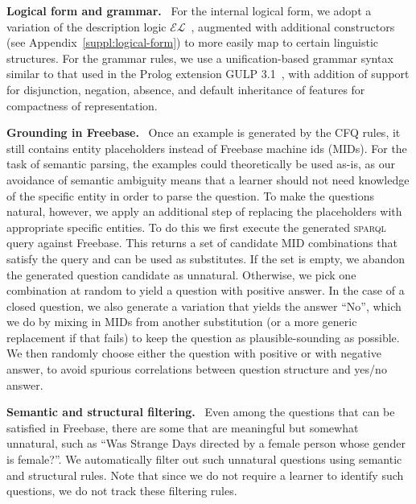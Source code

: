 \documentclass[letterpaper]{article}
\newcommand{\myparagraph}[1]{\textbf{#1}~}
\newcommand{\SPARQL}{\textsc{sparql}}
\begin{document}
\myparagraph{Logical form and grammar.}
For the internal logical form, we adopt a variation of the description logic $\mathcal{EL}$~\citep{baader2003description,baader2005el}, augmented with additional constructors 
(see Appendix~\ref{suppl:logical-form})
to more easily map to certain linguistic structures.
For the grammar rules, we use a unification-based grammar syntax similar to that used in the Prolog extension GULP 3.1~\citep{covington1994gulp}, with addition of support for disjunction, negation, absence, and default inheritance of features for compactness of representation.

\myparagraph{Grounding in Freebase.}
Once an example is generated by the CFQ rules, it still contains entity placeholders instead of Freebase machine ids (MIDs). For the task of semantic parsing, the examples could theoretically be used as-is, as our avoidance of semantic ambiguity means that a learner should not need knowledge of the specific entity in order to parse the question. To make the questions natural, however, we apply an additional step of replacing the placeholders with appropriate specific entities. To do this we first execute the generated \SPARQL{} query against Freebase. This returns a set of candidate MID combinations that satisfy the query and can be used as substitutes.
If the set is empty, we abandon the generated question candidate as unnatural. Otherwise, we pick one combination at random to yield a question with positive answer. 
In the case of a closed question, we also generate a variation that yields the answer ``No'', which we do by mixing in MIDs from another substitution (or a more generic replacement if that fails) to keep the question as plausible-sounding as possible.
We then randomly choose either the question with positive or with negative answer, to avoid spurious correlations between question structure and yes/no answer.

\myparagraph{Semantic and structural filtering.}
Even among the questions that can be satisfied in Freebase, there are some that are  meaningful but somewhat unnatural, such as ``Was Strange Days directed by a female person whose gender is female?''. We automatically filter out such unnatural questions using semantic and structural rules. 
Note that since we do not require a learner to identify such questions, we do not track these filtering rules.
\end{document}
